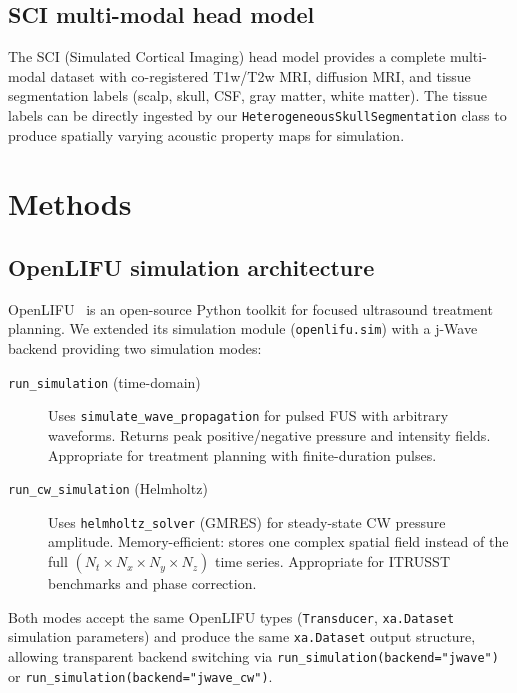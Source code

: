 \documentclass[11pt,a4paper]{article}\usepackage[]{graphicx}\usepackage[]{xcolor}
\begin{document}
\subsection{SCI multi-modal head model}

The SCI (Simulated Cortical Imaging) head model provides a complete
multi-modal dataset with co-registered T1w/T2w MRI, diffusion MRI, and
tissue segmentation labels (scalp, skull, CSF, gray matter, white
matter). The tissue labels can be directly ingested by our
\texttt{HeterogeneousSkullSegmentation} class to produce spatially
varying acoustic property maps for simulation.

\section{Methods}
\label{sec:methods}

\subsection{OpenLIFU simulation architecture}

OpenLIFU~\citep{OpenLIFU} is an open-source Python toolkit for focused
ultrasound treatment planning. We extended its simulation module
(\texttt{openlifu.sim}) with a j-Wave backend providing two simulation
modes:

\begin{description}
  \item[\texttt{run\_simulation} (time-domain)] Uses
    \texttt{simulate\_wave\_propagation} for pulsed FUS with arbitrary
    waveforms. Returns peak positive/negative pressure and intensity
    fields. Appropriate for treatment planning with finite-duration
    pulses.
  \item[\texttt{run\_cw\_simulation} (Helmholtz)] Uses
    \texttt{helmholtz\_solver} (GMRES) for steady-state CW pressure
    amplitude. Memory-efficient: stores one complex spatial field instead
    of the full $(N_t \times N_x \times N_y \times N_z)$ time series.
    Appropriate for ITRUSST benchmarks and phase correction.
\end{description}

Both modes accept the same OpenLIFU types (\texttt{Transducer},
\texttt{xa.Dataset} simulation parameters) and produce the same
\texttt{xa.Dataset} output structure, allowing transparent backend
switching via \texttt{run\_simulation(backend="jwave")} or
\texttt{run\_simulation(backend="jwave\_cw")}.
\end{document}
